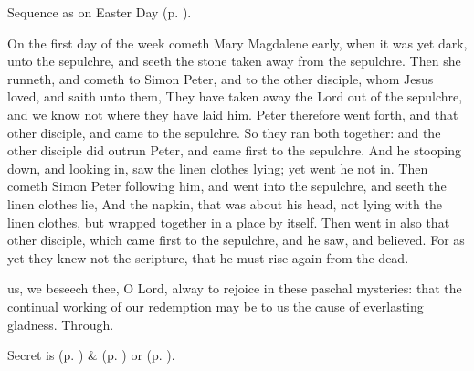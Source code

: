 \begin{rubric}
    Sequence as on Easter Day (p. \pageref{PaschalSequence}).
\end{rubric}

\vspace{-1\baselineskip}

 On the first day of the week cometh Mary Magdalene early, when it was yet dark, unto the sepulchre, and seeth the stone taken away from the sepulchre. Then she runneth, and cometh to Simon Peter, and to the other disciple, whom Jesus loved, and saith unto them, They have taken away the Lord out of the sepulchre, and we know not where they have laid him. Peter therefore went forth, and that other disciple, and came to the sepulchre. So they ran both together: and the other disciple did outrun Peter, and came first to the sepulchre. And he stooping down, and looking in, saw the linen clothes lying; yet went he not in. Then cometh Simon Peter following him, and went into the sepulchre, and seeth the linen clothes lie, And the napkin, that was about his head, not lying with the linen clothes, but wrapped together in a place by itself. Then went in also that other disciple, which came first to the sepulchre, and he saw, and believed. For as yet they knew not the scripture, that he must rise again from the dead.


\vspace{-0.5\baselineskip}

\secret
{} us, we beseech thee, O Lord, alway to rejoice in these paschal mysteries: that the continual working of our redemption may be to us the cause of everlasting gladness. Through.
\begin{rubric}
     Secret is  (p. \pageref{EasterSecret}) \&   (p. \pageref{SPAgainst}) or  (p. \pageref{SPChiefBishop}).
\end{rubric}


\vspace{-0.5\baselineskip}

